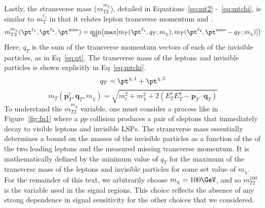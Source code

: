 Lastly, the stransverse mass ($m_{T2}^{m_{\chi}}$), detailed in Equations~\ref{eq:mt2} -~\ref{eq:mtchi}, is similar to $m_\text{T}^{\ell_1}$ in that it relates lepton transverse momentum and \met{} \cite{baar}.
\begin{equation}
\label{eq:mt2}
m^{m_\chi}_{T2}(\pt^{\ell_1}, \pt^{\ell_2}, \pt^{\mathrm{miss}})  = \underaccent{\mathbf{q}_T}{\text{min}}\big(\text{max}[m_T(\pt^{\ell_1}, q_T; m_\chi), m_T(\pt^{\ell_2}, \pt^{\mathrm{miss}}-q_T; m_\chi)]\big)
\end{equation}
Here, $q_T$ is the sum of the transverse momentum vectors of each of the invisible particles, as in Eq~\ref{eq:qt}.  The transverse mass of the leptons and invisible particles is shown explicitly in Eq~\ref{eq:mtchi}.
\begin{equation}
\label{eq:qt}
q_T = \pt^{\chi,1}+\pt^{\chi,2}
\end{equation}
\begin{equation}
 m_T\left(\mathbf{p}_T^{\ell}, \mathbf{q}_T, m_\chi\right)= \sqrt{m_\ell^2 + m_\chi^2 + 2\left(E_T^\ell E_T^q -\mathbf{p}_T\cdot \mathbf{q}_T\right)}
 \label{eq:mtchi}
 \end{equation}
To understand the $m_{T2}^{m_{\chi}}$ variable, one must consider a process like in Figure~\ref{fig:fn1} where a $pp$ collision produces a pair of sleptons that immediately decay to visible leptons and invisible LSPs.  The stransverse mass essentially determines a bound on the masses of the invisible particles as a function of the \pt of the two leading leptons and the measured missing transverse momentum.  It is mathematically defined by the minimum value of $q_T$ for the maximum of the transverse mass of the leptons and invisible particles for some set value of $m_\chi$.  For the remainder of this text, we arbitrarily choose $m_\chi = 100\GeV$, and so $m_{T2}^{100}$ is the variable used in the signal regions.  This choice reflects the absence of any strong dependence in signal sensitivity for the other choices that we considered.  %



  
